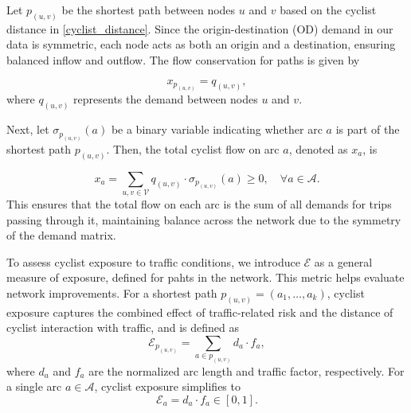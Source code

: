 \documentclass[letterpaper, 10 pt, conference]{ieeeconf}  %
\begin{document}




Let $p_{(u,v)}$ be the shortest path between nodes $u$ and $v$ based on the cyclist distance in \eqref{cyclist_distance}. Since the origin-destination (OD) demand in our data is symmetric, each node acts as both an origin and a destination, ensuring balanced inflow and outflow. The flow conservation for paths is given by

\begin{equation}
\label{eq_shortest_path}
    x_{p_{(u,v)}} = q_{(u,v)},
\end{equation}
where $q_{(u,v)}$ represents the demand between nodes $u$ and $v$.  

Next, let $\sigma_{p_{(u,v)}}(a)$ be a binary variable indicating whether arc $a$ is part of the shortest path $p_{(u,v)}$. Then, the total cyclist flow on arc $a$, denoted as $x_a$, is

\begin{equation}
\label{eq_flows}
  x_{a} = \sum_{u,v \in \mathcal{V}} q_{(u,v)} \cdot \sigma_{p_{(u,v)}}(a) \geq 0, \quad \forall a \in \mathcal{A}.
\end{equation}
This ensures that the total flow on each arc is the sum of all demands for trips passing through it, maintaining balance across the network due to the symmetry of the demand matrix.


To assess cyclist exposure to traffic conditions, we introduce $\mathcal{E}$ as a general measure of exposure, defined for pahts in the network. This metric helps evaluate network improvements. For a shortest path $p_{(u,v)} = (a_1, \dots, a_k)$, cyclist exposure captures the combined effect of traffic-related risk and the distance of cyclist interaction with traffic, and is defined as
\begin{equation}
\label{exposure_def}
    \mathcal{E}_{p_{(u,v)}} = \sum_{a \in p_{(u,v)}} d_{a} \cdot f_{a},
\end{equation}
where $d_{a}$ and $f_{a}$ are the normalized arc length and traffic factor, respectively. For a single arc $a \in \mathcal{A}$, cyclist exposure simplifies to
\begin{equation}
\label{arc_exposure}
    \mathcal{E}_{a} = d_{a} \cdot f_{a} \in  \left [ 0,1 \right ].
\end{equation}
\end{document}
